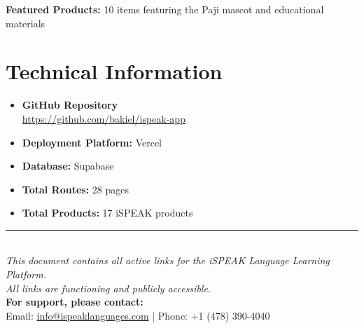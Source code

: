 \documentclass[11pt,a4paper]{article}
\begin{document}
\textbf{Featured Products:} 10 items featuring the Paji mascot and educational materials

\section{Technical Information}

\begin{itemize}[itemsep=0.5em]
    \item \textbf{GitHub Repository}\\
    \href{https://github.com/bakiel/ispeak-app}{https://github.com/bakiel/ispeak-app}
    
    \item \textbf{Deployment Platform:} Vercel
    
    \item \textbf{Database:} Supabase
    
    \item \textbf{Total Routes:} 28 pages
    
    \item \textbf{Total Products:} 17 iSPEAK products
\end{itemize}

\vspace{2cm}

\begin{center}
    \rule{0.8\textwidth}{0.4pt}\\[0.5cm]
    \textit{This document contains all active links for the iSPEAK Language Learning Platform.}\\
    \textit{All links are functioning and publicly accessible.}\\[0.5cm]
    \textbf{For support, please contact:}\\
    Email: \href{mailto:info@ispeaklanguages.com}{info@ispeaklanguages.com} | Phone: +1 (478) 390-4040
\end{center}
\end{document}
